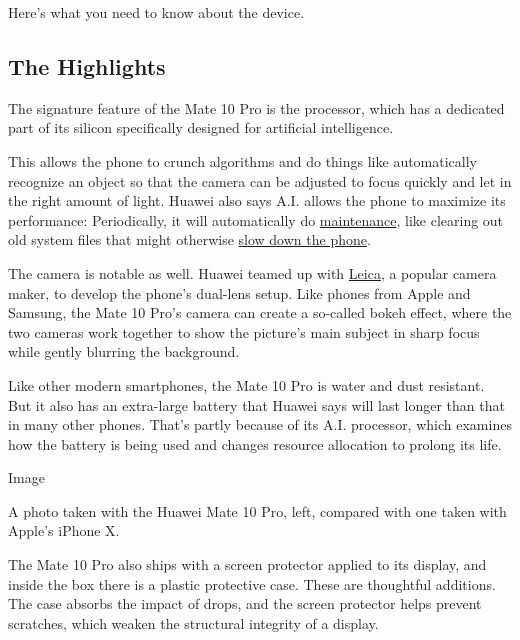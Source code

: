 Here's what you need to know about the device.

\hypertarget{the-highlights}{%
\subsection{The Highlights}\label{the-highlights}}

The signature feature of the Mate 10 Pro is the processor, which has a
dedicated part of its silicon specifically designed for artificial
intelligence.

This allows the phone to crunch algorithms and do things like
automatically recognize an object so that the camera can be adjusted to
focus quickly and let in the right amount of light. Huawei also says
A.I. allows the phone to maximize its performance: Periodically, it will
automatically do
\href{https://www.nytimes.com/2016/04/21/technology/personaltech/choosing-to-skipthe-upgrade-and-care-for-the-gadget-youve-got.html}{maintenance},
like clearing out old system files that might otherwise
\href{https://www.nytimes.com/2017/11/15/technology/personaltech/new-iphones-slow-tech-myth.html}{slow
down the phone}.

The camera is notable as well. Huawei teamed up with
\href{http://www.nytimes.com/2013/10/17/technology/personaltech/paying-more-for-the-leica-name.html}{Leica},
a popular camera maker, to develop the phone's dual-lens setup. Like
phones from Apple and Samsung, the Mate 10 Pro's camera can create a
so-called bokeh effect, where the two cameras work together to show the
picture's main subject in sharp focus while gently blurring the
background.

Like other modern smartphones, the Mate 10 Pro is water and dust
resistant. But it also has an extra-large battery that Huawei says will
last longer than that in many other phones. That's partly because of its
A.I. processor, which examines how the battery is being used and changes
resource allocation to prolong its life.

Image

A photo taken with the Huawei Mate 10 Pro, left, compared with one taken
with Apple's iPhone X.

The Mate 10 Pro also ships with a screen protector applied to its
display, and inside the box there is a plastic protective case. These
are thoughtful additions. The case absorbs the impact of drops, and the
screen protector helps prevent scratches, which weaken the structural
integrity of a display.

